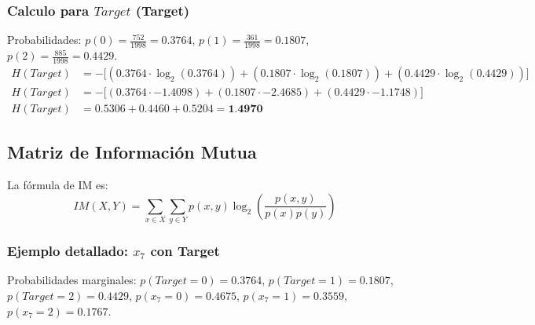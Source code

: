 \documentclass[12pt,a4paper]{article}
\begin{document}
\subsubsection{Calculo para $Target$ (Target)}
Probabilidades: $p(0) = \frac{752}{1998} = 0.3764$, $p(1) = \frac{361}{1998} = 0.1807$, $p(2) = \frac{885}{1998} = 0.4429$.
\begin{align*}
    H(Target) &= -\big[ (0.3764 \cdot \log_2(0.3764)) + (0.1807 \cdot \log_2(0.1807)) + (0.4429 \cdot \log_2(0.4429)) \big] \\
    H(Target) &= -\big[ (0.3764 \cdot -1.4098) + (0.1807 \cdot -2.4685) + (0.4429 \cdot -1.1748) \big] \\
    H(Target) &= 0.5306 + 0.4460 + 0.5204 = \textbf{1.4970}
\end{align*}

\subsection{Matriz de Información Mutua}

La fórmula de IM es:
\begin{equation}
    IM(X,Y) = \sum_{x \in X}\sum_{y \in Y} p(x,y) \log_2 \left(\frac{p(x,y)}{p(x)p(y)}\right)
\end{equation}

\subsubsection{Ejemplo detallado: $x_7$ con Target}

Probabilidades marginales: $p(Target=0)=0.3764$, $p(Target=1)=0.1807$, $p(Target=2)=0.4429$, $p(x_7=0)=0.4675$, $p(x_7=1)=0.3559$, $p(x_7=2)=0.1767$.
\end{document}
